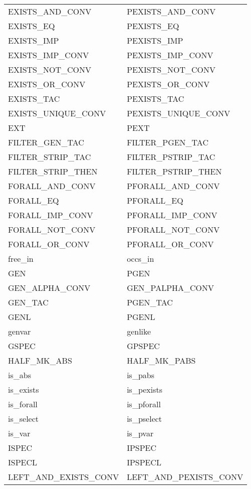 {\begin{center}
\begin{tabular}[t]{|l|l|}
		EXISTS\_AND\_CONV			&	PEXISTS\_AND\_CONV			\\
		EXISTS\_EQ					&	PEXISTS\_EQ					\\
		EXISTS\_IMP					&	PEXISTS\_IMP				\\
		EXISTS\_IMP\_CONV			&	PEXISTS\_IMP\_CONV			\\
		EXISTS\_NOT\_CONV			&	PEXISTS\_NOT\_CONV			\\
		EXISTS\_OR\_CONV			&	PEXISTS\_OR\_CONV			\\
		EXISTS\_TAC					&	PEXISTS\_TAC				\\
		EXISTS\_UNIQUE\_CONV		&	PEXISTS\_UNIQUE\_CONV		\\
		EXT							&	PEXT						\\
		FILTER\_GEN\_TAC			&	FILTER\_PGEN\_TAC			\\
		FILTER\_STRIP\_TAC			&	FILTER\_PSTRIP\_TAC			\\
		FILTER\_STRIP\_THEN			&	FILTER\_PSTRIP\_THEN		\\
		FORALL\_AND\_CONV			&	PFORALL\_AND\_CONV			\\
		FORALL\_EQ					&	PFORALL\_EQ					\\
		FORALL\_IMP\_CONV			&	PFORALL\_IMP\_CONV			\\
		FORALL\_NOT\_CONV			&	PFORALL\_NOT\_CONV			\\
		FORALL\_OR\_CONV			&	PFORALL\_OR\_CONV			\\
		free\_in 					&	occs\_in					\\
		GEN							&	PGEN						\\
		GEN\_ALPHA\_CONV			&	GEN\_PALPHA\_CONV			\\
		GEN\_TAC					&	PGEN\_TAC					\\
		GENL						&	PGENL						\\
		genvar						&	genlike						\\
		GSPEC						&	GPSPEC						\\
		HALF\_MK\_ABS				&	HALF\_MK\_PABS				\\
		is\_abs						&	is\_pabs					\\
		is\_exists					&	is\_pexists					\\
		is\_forall					&	is\_pforall					\\
		is\_select					&	is\_pselect					\\
		is\_var						&	is\_pvar					\\
		ISPEC						&	IPSPEC						\\
		ISPECL						&	IPSPECL						\\
		LEFT\_AND\_EXISTS\_CONV		&	LEFT\_AND\_PEXISTS\_CONV	\\

\end{tabular}
\end{center}}
